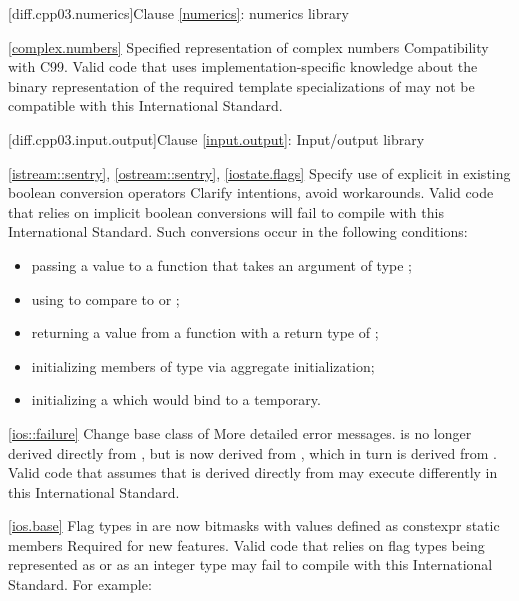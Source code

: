 [diff.cpp03.numerics]{Clause \ref{numerics}: numerics library}

\ref{complex.numbers}
\change Specified representation of complex numbers
\rationale Compatibility with C99.
\effect
Valid \CppIII code that uses implementation-specific knowledge about the
binary representation of the required template specializations of
 may not be compatible with this International Standard.

[diff.cpp03.input.output]{Clause \ref{input.output}: Input/output library}

\ref{istream::sentry},
\ref{ostream::sentry},
\ref{iostate.flags}
\change Specify use of explicit in existing boolean conversion operators
\rationale Clarify intentions, avoid workarounds.
\effect
Valid \CppIII code that relies on implicit boolean conversions will fail to
compile with this International Standard. Such conversions occur in the
following conditions:

\begin{itemize}
\item passing a value to a function that takes an argument of type ;
\item using  to compare to  or ;
\item returning a value from a function with a return type of ;
\item initializing members of type  via aggregate initialization;
\item initializing a  which would bind to a temporary.
\end{itemize}

\ref{ios::failure}
\change Change base class of 
\rationale More detailed error messages.
\effect
{} is no longer derived directly from
, but is now derived from ,
which in turn is derived from . Valid \CppIII code
that assumes that  is derived directly from
 may execute differently in this International Standard.

\ref{ios.base}
\change Flag types in  are now bitmasks with values
defined as constexpr static members
\rationale Required for new features.
\effect
Valid \CppIII code that relies on  flag types being
represented as  or as an integer type may fail to compile
with this International Standard. For example:


